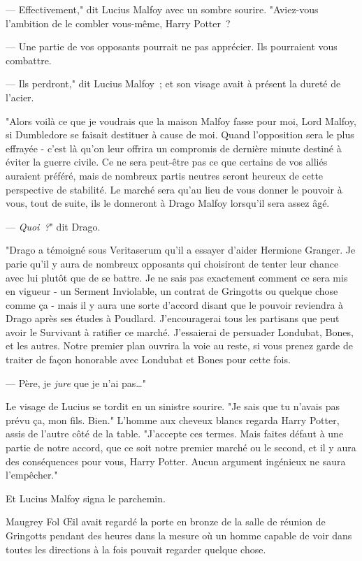 --- Effectivement," dit Lucius Malfoy avec un sombre sourire. "Aviez-vous l'ambition de le combler vous-même, Harry Potter~?

--- Une partie de vos opposants pourrait ne pas apprécier. Ils pourraient vous combattre.

--- Ils perdront," dit Lucius Malfoy~; et son visage avait à présent la dureté de l'acier.

"Alors voilà ce que je voudrais que la maison Malfoy fasse pour moi, Lord Malfoy, si Dumbledore se faisait destituer à cause de moi. Quand l'opposition sera le plus effrayée - c'est là qu'on leur offrira un compromis de dernière minute destiné à éviter la guerre civile. Ce ne sera peut-être pas ce que certains de vos alliés auraient préféré, mais de nombreux partis neutres seront heureux de cette perspective de stabilité. Le marché sera qu'au lieu de vous donner le pouvoir à vous, tout de suite, ils le donneront à Drago Malfoy lorsqu'il sera assez âgé.

--- \emph{Quoi~?}" dit Drago.

"Drago a témoigné sous Veritaserum qu'il a essayer d'aider Hermione Granger. Je parie qu'il y aura de nombreux opposants qui choisiront de tenter leur chance avec lui plutôt que de se battre. Je ne sais pas exactement comment ce sera mis en vigueur - un Serment Inviolable, un contrat de Gringotts ou quelque chose comme ça - mais il y aura une sorte d'accord disant que le pouvoir reviendra à Drago après ses études à Poudlard. J'encouragerai tous les partisans que peut avoir le Survivant à ratifier ce marché. J'essaierai de persuader Londubat, Bones, et les autres. Notre premier plan ouvrira la voie au reste, si vous prenez garde de traiter de façon honorable avec Londubat et Bones pour cette fois.

--- Père, je \emph{jure} que je n'ai pas…"

Le visage de Lucius se tordit en un sinistre sourire. "Je sais que tu n'avais pas prévu ça, mon fils. Bien." L'homme aux cheveux blancs regarda Harry Potter, assis de l'autre côté de la table. "J'accepte ces termes. Mais faites défaut à une partie de notre accord, que ce soit notre premier marché ou le second, et il y aura des conséquences pour vous, Harry Potter. Aucun argument ingénieux ne saura l'empêcher."

Et Lucius Malfoy signa le parchemin.

\later

Maugrey Fol Œil avait regardé la porte en bronze de la salle de réunion de Gringotts pendant des heures dans la mesure où un homme capable de voir dans toutes les directions à la fois pouvait regarder quelque chose.

